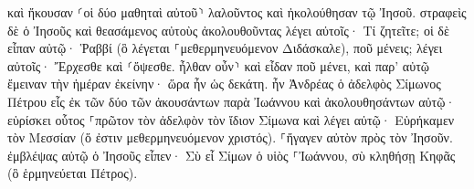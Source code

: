 \documentclass{openreader}
\begin{document}
καὶ ἤκουσαν ⸂οἱ δύο μαθηταὶ αὐτοῦ⸃ λαλοῦντος καὶ ἠκολούθησαν τῷ Ἰησοῦ. 
στραφεὶς δὲ ὁ Ἰησοῦς καὶ θεασάμενος αὐτοὺς ἀκολουθοῦντας λέγει αὐτοῖς· Τί ζητεῖτε; οἱ δὲ εἶπαν αὐτῷ· Ῥαββί (ὃ λέγεται ⸀μεθερμηνευόμενον Διδάσκαλε), ποῦ μένεις; 
λέγει αὐτοῖς· Ἔρχεσθε καὶ ⸂ὄψεσθε. ἦλθαν οὖν⸃ καὶ εἶδαν ποῦ μένει, καὶ παρ’ αὐτῷ ἔμειναν τὴν ἡμέραν ἐκείνην· ὥρα ἦν ὡς δεκάτη. 
ἦν Ἀνδρέας ὁ ἀδελφὸς Σίμωνος Πέτρου εἷς ἐκ τῶν δύο τῶν ἀκουσάντων παρὰ Ἰωάννου καὶ ἀκολουθησάντων αὐτῷ· 
εὑρίσκει οὗτος ⸀πρῶτον τὸν ἀδελφὸν τὸν ἴδιον Σίμωνα καὶ λέγει αὐτῷ· Εὑρήκαμεν τὸν Μεσσίαν (ὅ ἐστιν μεθερμηνευόμενον χριστός). 
⸀ἤγαγεν αὐτὸν πρὸς τὸν Ἰησοῦν. ἐμβλέψας αὐτῷ ὁ Ἰησοῦς εἶπεν· Σὺ εἶ Σίμων ὁ υἱὸς ⸀Ἰωάννου, σὺ κληθήσῃ Κηφᾶς (ὃ ἑρμηνεύεται Πέτρος). 
\end{document}
